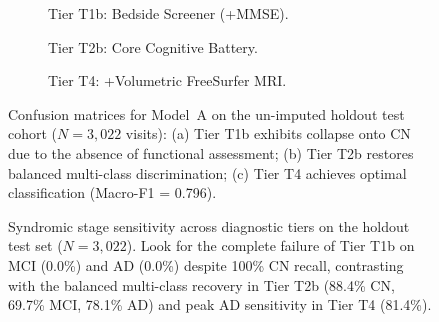 \documentclass[11pt,a4paper]{article}
\begin{document}
\begin{figure}[t]
\centering
\begin{subfigure}[t]{0.32\linewidth}
    \centering
    \caption{Tier T1b: Bedside Screener (+MMSE).}
    \label{fig:stager_cm_t1b}
\end{subfigure}
\hfill
\begin{subfigure}[t]{0.32\linewidth}
    \centering
    \caption{Tier T2b: Core Cognitive Battery.}
    \label{fig:stager_cm_t2b}
\end{subfigure}
\hfill
\begin{subfigure}[t]{0.32\linewidth}
    \centering
    \caption{Tier T4: +Volumetric FreeSurfer MRI.}
    \label{fig:stager_cm_t4}
\end{subfigure}
\caption{Confusion matrices for Model~A on the un-imputed holdout test cohort ($N = 3,022$ visits): (a) Tier T1b exhibits collapse onto CN due to the absence of functional assessment; (b) Tier T2b restores balanced multi-class discrimination; (c) Tier T4 achieves optimal classification (Macro-F1 = 0.796).}
\label{fig:stager_confusion_matrices}
\end{figure}

\begin{figure}[t]
\centering
{}
\caption{Syndromic stage sensitivity across diagnostic tiers on the holdout test set ($N = 3,022$). Look for the complete failure of Tier T1b on MCI (0.0\%) and AD (0.0\%) despite 100\% CN recall, contrasting with the balanced multi-class recovery in Tier T2b (88.4\% CN, 69.7\% MCI, 78.1\% AD) and peak AD sensitivity in Tier T4 (81.4\%).}
\label{fig:tier_per_class_recall}
\end{figure}
\end{document}
